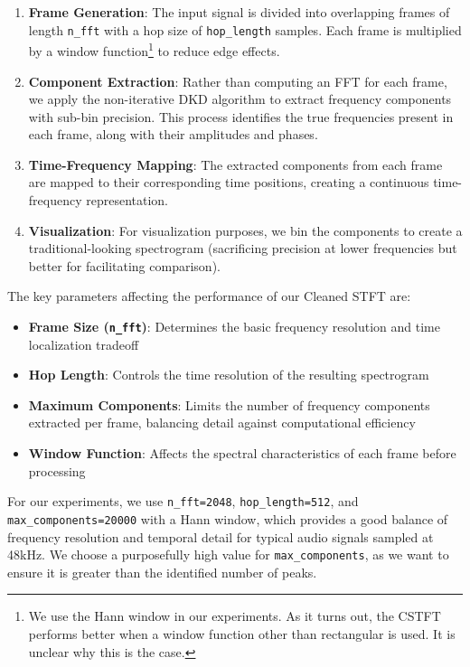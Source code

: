 \documentclass[11pt,twoside]{report}
\numberwithin{thm}{section}
\numberwithin{equation}{section}
\begin{document}
\begin{enumerate}
    \item \textbf{Frame Generation}: The input signal is divided into overlapping frames of length \texttt{n\_fft} with a hop size of \texttt{hop\_length} samples. Each frame is multiplied by a window function\footnote{We use the Hann window in our experiments. As it turns out, the CSTFT performs better when a window function other than rectangular is used. It is unclear why this is the case.} to reduce edge effects.
    
    \item \textbf{Component Extraction}: Rather than computing an FFT for each frame, we apply the non-iterative DKD algorithm to extract frequency components with sub-bin precision. This process identifies the true frequencies present in each frame, along with their amplitudes and phases.
    
    \item \textbf{Time-Frequency Mapping}: The extracted components from each frame are mapped to their corresponding time positions, creating a continuous time-frequency representation.
    
    \item \textbf{Visualization}: For visualization purposes, we bin the components to create a traditional-looking spectrogram (sacrificing precision at lower frequencies but better for facilitating comparison).
    
\end{enumerate}

The key parameters affecting the performance of our Cleaned STFT are:

\begin{itemize}
    \item \textbf{Frame Size (\texttt{n\_fft})}: Determines the basic frequency resolution and time localization tradeoff
    \item \textbf{Hop Length}: Controls the time resolution of the resulting spectrogram
    \item \textbf{Maximum Components}: Limits the number of frequency components extracted per frame, balancing detail against computational efficiency
    \item \textbf{Window Function}: Affects the spectral characteristics of each frame before processing
\end{itemize}

For our experiments, we use \texttt{n\_fft=2048}, \texttt{hop\_length=512}, and \texttt{max\_components=20000} with a Hann window, which provides a good balance of frequency resolution and temporal detail for typical audio signals sampled at 48kHz. We choose a purposefully high value for \texttt{max\_components}, as we want to ensure it is greater than the identified number of peaks.
\end{document}
